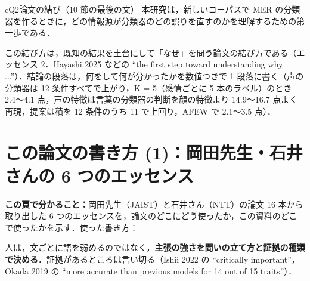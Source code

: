 \documentclass[a4paper,10pt]{ltjsarticle}
\newcommand{\koko}[2][]{\begin{headbar}\textbf{この頁で分かること：}#2\if\relax\detokenize{#1}\relax\else\hfill{\small 使った書き方：}#1\fi\end{headbar}}
\newcommand{\pagesection}[1]{\clearpage\section{#1}}
\begin{document}
\begin{kotae}{cQ2}{論文の結び（10 節の最後の文）}
本研究は，新しいコーパスで MER の分類器を作るときに，どの情報源が分類器のどの誤りを直すのかを理解するための第一歩である．
\end{kotae}
\noindent この結び方は，既知の結果を土台にして「なぜ」を問う論文の結び方である（エッセンス 2．Hayashi 2025 などの ``the first step toward understanding why ...''）．結論の段落は，何をして何が分かったかを数値つきで 1 段落に書く（声の分類器は 12 条件すべてで上がり，K = 5（感情ごとに 5 本のラベル）のとき 2.4〜4.1 点，声の特徴は言葉の分類器の判断を顔の特徴より 14.9〜16.7 点よく再現，提案は積を 12 条件のうち 11 で上回り，AFEW で 2.1〜3.5 点）．

\pagesection{この論文の書き方 (1)：岡田先生・石井さんの 6 つのエッセンス}\label{sec:kakikata}
\koko{岡田先生（JAIST）と石井さん（NTT）の論文 16 本から取り出した 6 つのエッセンスを，論文のどこにどう使ったか，この資料のどこで使ったかを示す．}

 人は，文ごとに語を弱めるのではなく，\textbf{主張の強さを問いの立て方と証拠の種類で決める}．証拠があるところは言い切る（Ishii 2022 の ``critically important''，Okada 2019 の ``more accurate than previous models for 14 out of 15 traits''）．
\end{document}
